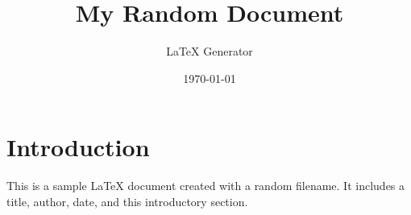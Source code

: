 \documentclass{article}
\title{My Random Document}
\author{LaTeX Generator}
\date{\today}
\begin{document}
\maketitle

\section{Introduction}
This is a sample LaTeX document created with a random filename. It includes a title, author, date, and this introductory section.
\end{document}
